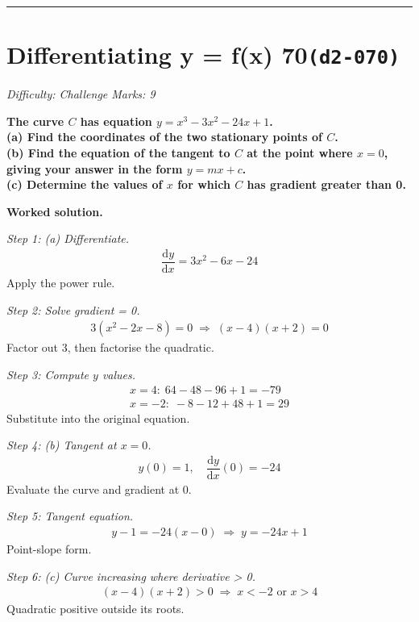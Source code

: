 \documentclass[11pt]{article}
\newcommand{\question}[1]{\par\medskip\noindent\textbf{#1}\par}
\begin{document}
\medskip\hrule

\section*{Differentiating y = f(x) 70\quad\small\texttt{(d2-070)}}
\textit{Difficulty: Challenge \quad\textbar\quad Marks: 9}

\question{The curve \( C \) has equation \( y = x^3 - 3x^2 - 24x + 1 \).\\[3pt]  (a) Find the coordinates of the two stationary points of \( C \).\\[3pt]  (b) Find the equation of the tangent to \( C \) at the point where \( x = 0 \), giving your answer in the form \( y = mx + c \).\\[3pt]  (c) Determine the values of \( x \) for which \( C \) has gradient greater than 0.}

\textbf{Worked solution.}

\textit{Step 1: (a) Differentiate.}
\[\begin{gathered}
\dfrac{\mathrm{d}y}{\mathrm{d}x} = 3x^2 - 6x - 24
\end{gathered}\]
Apply the power rule.

\textit{Step 2: Solve gradient = 0.}
\[\begin{gathered}
3(x^2 - 2x - 8) = 0 \;\Rightarrow\; (x-4)(x+2) = 0
\end{gathered}\]
Factor out 3, then factorise the quadratic.

\textit{Step 3: Compute \( y \) values.}
\[\begin{gathered}
x = 4: \; 64 - 48 - 96 + 1 = -79 \\ x = -2: \; -8 - 12 + 48 + 1 = 29
\end{gathered}\]
Substitute into the original equation.

\textit{Step 4: (b) Tangent at \( x = 0 \).}
\[\begin{gathered}
y(0) = 1, \quad \dfrac{\mathrm{d}y}{\mathrm{d}x}(0) = -24
\end{gathered}\]
Evaluate the curve and gradient at 0.

\textit{Step 5: Tangent equation.}
\[\begin{gathered}
y - 1 = -24(x - 0) \;\Rightarrow\; y = -24x + 1
\end{gathered}\]
Point-slope form.

\textit{Step 6: (c) Curve increasing where derivative > 0.}
\[\begin{gathered}
(x-4)(x+2) > 0 \;\Rightarrow\; x < -2 \text{ or } x > 4
\end{gathered}\]
Quadratic positive outside its roots.
\end{document}
